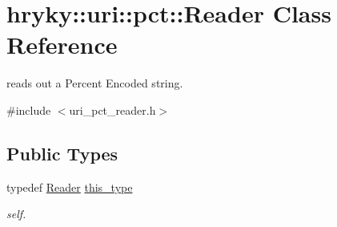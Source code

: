 \hypertarget{classhryky_1_1uri_1_1pct_1_1_reader}{\section{hryky\-:\-:uri\-:\-:pct\-:\-:Reader Class Reference}
\label{classhryky_1_1uri_1_1pct_1_1_reader}
}


reads out a Percent Encoded string.  




{\ttfamily \#include $<$uri\-\_\-pct\-\_\-reader.\-h$>$}

\subsection*{Public Types}
\begin{DoxyCompactItemize}
\item 
\hypertarget{classhryky_1_1uri_1_1pct_1_1_reader_a3b7a7d66f38f342ae28d4200727cdff1}{typedef \hyperlink{classhryky_1_1uri_1_1pct_1_1_reader}{Reader} \hyperlink{classhryky_1_1uri_1_1pct_1_1_reader_a3b7a7d66f38f342ae28d4200727cdff1}{this\-\_\-type}}\label{classhryky_1_1uri_1_1pct_1_1_reader_a3b7a7d66f38f342ae28d4200727cdff1}

\begin{DoxyCompactList}\small\item\em self. \end{DoxyCompactList}\end{DoxyCompactItemize}
